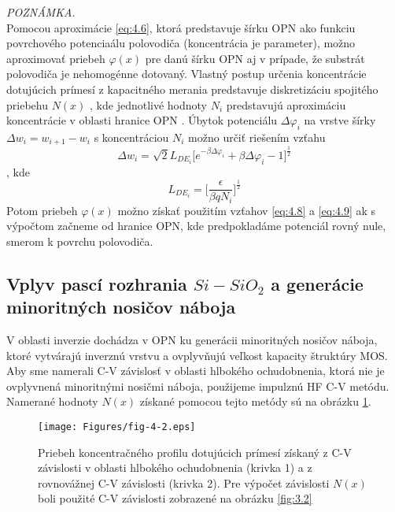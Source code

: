 \emph{POZNÁMKA.}\\
Pomocou aproximácie \ref{eq:4.6}, ktorá predstavuje šírku OPN ako
funkciu povrchového potenciaálu polovodiča (koncentrácia je
parameter), možno aproximovať priebeh $\varphi(x)$ pre danú šírku OPN
aj v prípade, že substrát polovodiča je nehomogénne dotovaný.  Vlastný
postup určenia koncentrácie dotujúcich prímesí z kapacitného merania
predstavuje diskretizáciu spojitého priebehu $N(x)$ , kde jednotlivé
hodnoty $N_i$ predstavujú aproximáciu koncentrácie v oblasti hranice
OPN \cite{4.1, 4.2, 4.3}.  Úbytok potenciálu $\Delta\varphi_i$ na
vrstve šírky $\Delta w_{i} = w_{i+1} - w_{i}$ s koncentráciou $N_i$
možno určiť riešením vzťahu
\begin{equation}\label{eq:4.8}
\Delta w_{i} = \sqrt{2}L_{DE_{i}}\Big[e^{-\beta\Delta\varphi_{i}} + \beta\Delta\varphi_{i} - 1\Big]^{\frac{1}{2}}
\end{equation}
, kde 
\begin{equation}\label{eq:4.9}
L_{DE_{i}} = \Big[\frac{\epsilon}{\beta qN_{i}}\Big]^{\frac{1}{2}}
\end{equation}
Potom priebeh $\varphi(x)$ možno získať použitím vzťahov \ref{eq:4.8}
a \ref{eq:4.9} ak s výpočtom začneme od hranice OPN, kde predpokladáme
potenciál rovný nule, smerom k povrchu polovodiča.


\subsection[Vplyv pascí rozhrania $Si-SiO_{2}$ a generácie minoritných nosičov náboja.]{Vplyv pascí rozhrania $Si-SiO_{2}$ a generácie minoritných nosičov náboja}\label{sec:4.1.3}

V oblasti inverzie dochádza v OPN ku generácii minoritných nosičov
náboja, ktoré vytvárajú inverznú vrstvu a ovplyvňujú veľkost kapacity
štruktúry MOS.  Aby sme namerali C-V závislosť v oblasti hlbokého
ochudobnenia, ktorá nie je ovplyvnená minoritnými nosičmi náboja,
použijeme impulznú HF C-V metódu. Namerané hodnoty $N(x)$ získané
pomocou tejto metódy sú na obrázku \ref{fig:4.2}.

\begin{figure}[h!]\centering
\texttt{[image: Figures/fig-4-2.eps]}
\captionsetup{justification=raggedright, singlelinecheck=false}
\caption[Priebeh koncentračného profilu dotujúcich prímesí získaný z
  C-V závislosti v oblasti hlbokého ochudobnenia a z rovnovážnej C-V
  závislosti]{Priebeh koncentračného profilu dotujúcich prímesí
  získaný z C-V závislosti v oblasti hlbokého ochudobnenia (krivka 1)
  a z rovnovážnej C-V závislosti (krivka 2).  Pre výpočet závislosti
  $N(x)$ boli použité C-V závislosti zobrazené na obrázku
  \ref{fig:3.2}}
\label{fig:4.2}
\end{figure}

